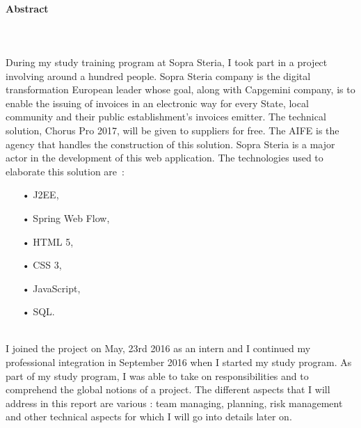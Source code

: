 \documentclass[12pt,a4paper]{article}
\begin{document}
\paragraph{Abstract}
~~\\\\
During my study training program at Sopra Steria, I took part in a project involving around a hundred people. Sopra Steria company is the digital transformation European leader whose goal, along with Capgemini company, is to enable the issuing of invoices in an electronic way for every State, local community and their public establishment’s invoices emitter. The technical solution, Chorus Pro 2017, will be given to suppliers for free. The \gls{AIFE} is the agency that handles the construction of this solution. Sopra Steria is a major actor in the development of this web application. The technologies used to elaborate this solution are~:\\
\begin{itemize}
\item[•] \gls{J2EE},
\item[•] Spring Web Flow,
\item[•] HTML 5,
\item[•] CSS 3,
\item[•] JavaScript,
\item[•] \gls{SQL}.
\end{itemize}
~~\\
 I joined the project on May, 23rd 2016 as an intern and I continued my professional integration in September 2016 when I started my study program. As part of my study program, I was able to take on responsibilities and to comprehend the global notions of a project. The different aspects that I will address in this report are various : team managing, planning, risk management and other technical aspects for which I will go into details later on. 
\newpage
\renewcommand{\contentsname}{Table des matières}
\tableofcontents
\newpage
\end{document}
